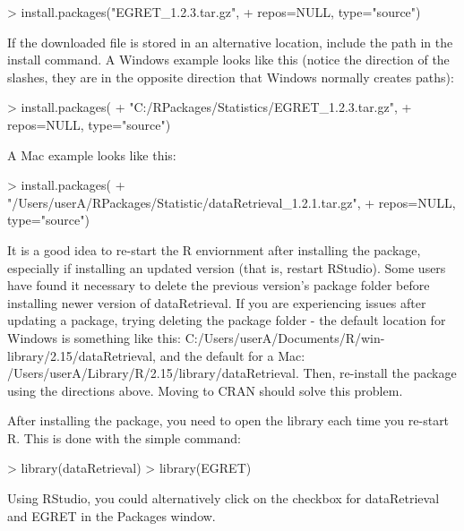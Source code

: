 \documentclass[a4paper,11pt]{article}
\begin{document}
\begin{Schunk}
\begin{Sinput}
> install.packages("EGRET_1.2.3.tar.gz", 
+                  repos=NULL, type="source")
\end{Sinput}
\end{Schunk}

If the downloaded file is stored in an alternative location, include the path in the install command.  A Windows example looks like this (notice the direction of the slashes, they are in the opposite direction that Windows normally creates paths):

\begin{Schunk}
\begin{Sinput}
> install.packages(
+   "C:/RPackages/Statistics/EGRET_1.2.3.tar.gz", 
+   repos=NULL, type="source")
\end{Sinput}
\end{Schunk}

A Mac example looks like this:

\begin{Schunk}
\begin{Sinput}
> install.packages(
+   "/Users/userA/RPackages/Statistic/dataRetrieval_1.2.1.tar.gz", 
+   repos=NULL, type="source")
\end{Sinput}
\end{Schunk}

It is a good idea to re-start the R enviornment after installing the package, especially if installing an updated version (that is, restart RStudio). Some users have found it necessary to delete the previous version's package folder before installing newer version of dataRetrieval. If you are experiencing issues after updating a package, trying deleting the package folder - the default location for Windows is something like this: C:/Users/userA/Documents/R/win-library/2.15/dataRetrieval, and the default for a Mac: /Users/userA/Library/R/2.15/library/dataRetrieval. Then, re-install the package using the directions above. Moving to CRAN should solve this problem.

After installing the package, you need to open the library each time you re-start R.  This is done with the simple command:
\begin{Schunk}
\begin{Sinput}
> library(dataRetrieval)
> library(EGRET)
\end{Sinput}
\end{Schunk}
Using RStudio, you could alternatively click on the checkbox for dataRetrieval and EGRET in the Packages window.
\end{document}
